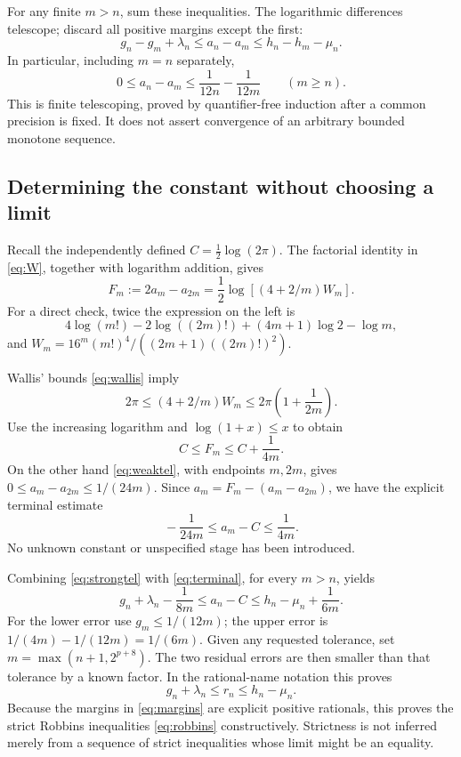 \documentclass[11pt]{article}
\theoremstyle{definition}
\newcommand{\lmargin}{\lambda}
\newcommand{\umargin}{\mu}
\begin{document}
For any finite $m>n$, sum these inequalities. The logarithmic differences
telescope; discard all positive margins except the first:
\begin{equation}\label{eq:strongtel}
 g_n-g_m+\lmargin_n\le a_n-a_m
 \le h_n-h_m-\umargin_n.
\end{equation}
In particular, including $m=n$ separately,
\begin{equation}\label{eq:weaktel}
 0\le a_n-a_m\le\frac1{12n}-\frac1{12m}\qquad(m\ge n).
\end{equation}
This is finite telescoping, proved by quantifier-free induction after a
common precision is fixed. It does not assert convergence of an
arbitrary bounded monotone sequence.

\subsection{Determining the constant without choosing a limit}

Recall the independently defined $C=\frac12\log(2\pi)$.
The factorial identity in \eqref{eq:W}, together with logarithm addition,
gives
\begin{equation}\label{eq:F}
 F_m:=2a_m-a_{2m}
 =\frac12\log\left[(4+2/m)W_m\right].
\end{equation}
For a direct check, twice the expression on the left is
\[
 4\log(m!)-2\log((2m)!)+(4m+1)\log2-\log m,
\]
and $W_m=16^m(m!)^4/((2m+1)((2m)!)^2)$.

Wallis' bounds \eqref{eq:wallis} imply
\[
 2\pi\le(4+2/m)W_m\le2\pi\left(1+\frac1{2m}\right).
\]
Use the increasing logarithm and $\log(1+x)\le x$ to obtain
\begin{equation}\label{eq:Fbound}
 C\le F_m\le C+\frac1{4m}.
\end{equation}
On the other hand \eqref{eq:weaktel}, with endpoints $m,2m$, gives
$0\le a_m-a_{2m}\le1/(24m)$. Since
$a_m=F_m-(a_m-a_{2m})$, we have the explicit terminal estimate
\begin{equation}\label{eq:terminal}
 \boxed{\qquad -\frac1{24m}\le a_m-C\le\frac1{4m}.\qquad}
\end{equation}
No unknown constant or unspecified stage has been introduced.

Combining \eqref{eq:strongtel} with \eqref{eq:terminal}, for every
$m>n$, yields
\begin{equation}\label{eq:finitefinal}
 g_n+\lmargin_n-\frac1{8m}\le a_n-C
 \le h_n-\umargin_n+\frac1{6m}.
\end{equation}
For the lower error use $g_m\le1/(12m)$; the upper error is
$1/(4m)-1/(12m)=1/(6m)$. Given any requested tolerance, set
$m=\max(n+1,2^{p+8})$. The two residual errors are then smaller
than that tolerance by a known factor. In the rational-name notation this
proves
\begin{equation}\label{eq:strongrobbins}
 g_n+\lmargin_n\le r_n\le h_n-\umargin_n.
\end{equation}
Because the margins in \eqref{eq:margins} are explicit positive
rationals, this proves the strict Robbins inequalities
\eqref{eq:robbins} constructively. Strictness is not inferred merely
from a sequence of strict inequalities whose limit might be an equality.
\end{document}
